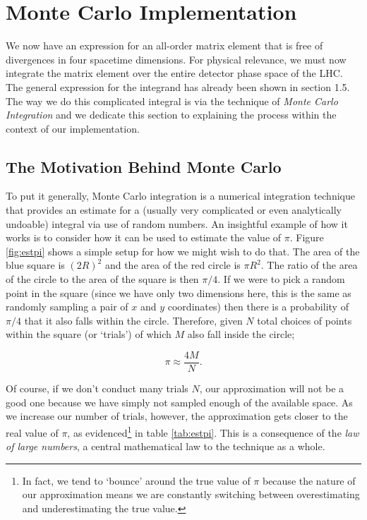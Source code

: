 \section{Monte Carlo Implementation}

We now have an expression for an all-order matrix element that is free of divergences in four spacetime dimensions. For physical relevance, we must now integrate the matrix element over the entire detector phase space of the LHC. The general expression for the integrand has already been shown in section 1.5. The way we do this complicated integral is via the technique of \emph{Monte Carlo Integration} and we dedicate this section to explaining the process within the context of our implementation.

\subsection{The Motivation Behind Monte Carlo}
To put it generally, Monte Carlo integration is a numerical integration technique that provides an estimate for a (usually very complicated or even analytically undoable) integral via use of random numbers. An insightful example of how it works is to consider how it can be used to estimate the value of $\pi$. Figure \ref{fig:estpi} shows a simple setup for how we might wish to do that. The area of the blue square is $(2R)^2$ and the area of the red circle is $\pi R^2$. The ratio of the area of the circle to the area of the square is then $\pi/4$. If we were to pick a random point in the square (since we have only two dimensions here, this is the same as randomly sampling a pair of $x$ and $y$ coordinates) then there is a probability of $\pi/4$ that it also falls within the circle. Therefore, given $N$ total choices of points within the square (or `trials') of which $M$ also fall inside the circle;

\begin{equation}
\pi \approx \frac{4M}{N}.
\end{equation} 

Of course, if we don't conduct many trials $N$, our approximation will not be a good one because we have simply not sampled enough of the available space. As we increase our number of trials, however, the approximation gets closer to the real value of $\pi$, as evidenced\footnote{In fact, we tend to `bounce' around the true value of $\pi$ because the nature of our approximation means we are constantly switching between overestimating and underestimating the true value.} in table \ref{tab:estpi}. This is a consequence of the \emph{law of large numbers}, a central mathematical law to the technique as a whole. 

